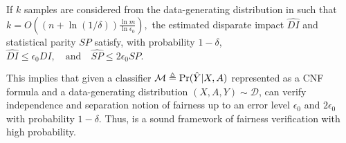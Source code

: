 \begin{corollary}
	If $k$ samples are considered from the data-generating distribution in {\justicia} such that 
	$
	k = O\left((n+ \ln(1/\delta))\frac{\ln m}{\ln \epsilon_0}\right),
	$
	the estimated disparate impact $\hat{DI}$ and statistical parity $\hat{SP}$ satisfy, with probability $1-\delta$,
	$
	\hat{DI} \leq  \epsilon_0 DI, \quad \text{and} \quad \hat{SP} \leq 2\epsilon_0 SP.
	$
\end{corollary}
This implies that given a classifier $ \mathcal{M} \triangleq \Pr(\hat{Y}|X, A) $ represented as a CNF formula and a data-generating distribution $ (X,A,Y) \sim \mathcal{D} $, {\justicia} can verify independence and separation notion of fairness up to an error level $\epsilon_0$ and $2\epsilon_0$ with probability $1-\delta$.
Thus, {\justicia} is a sound framework of fairness verification with high probability.



\iffalse

\begin{corollary}[Hypothesis]
	If $k$ samples are considered in \justicia and the estimated group fairness value $\hat{GF}$ satisfies
	\begin{equation*}
	1- e^{\epsilon_0} \leq \frac{\hat{GF}}{GF} \leq 1 + e^{\epsilon_0}
	\end{equation*}
	with probability $1-\delta$, then
	\begin{equation*}
	k = O\left((n+ \ln(1/\delta))\frac{m + \ln m}{\ln \epsilon_0}\right).
	\end{equation*}
\end{corollary}
\fi


